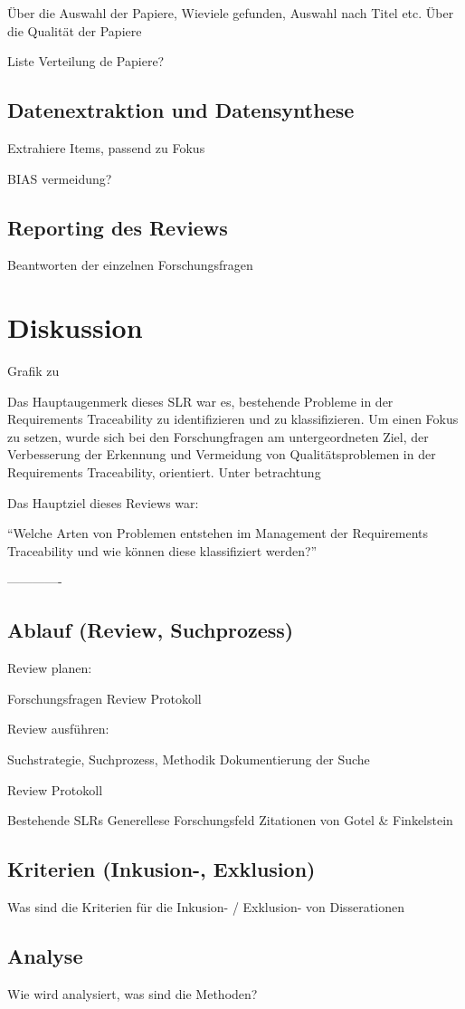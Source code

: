 Über die Auswahl der Papiere, Wieviele gefunden, Auswahl nach Titel etc.
Über die Qualität der Papiere

Liste Verteilung de Papiere?

\subsection{Datenextraktion und Datensynthese}

Extrahiere Items, passend zu Fokus



BIAS vermeidung?

\subsection{Reporting des Reviews}

Beantworten der einzelnen Forschungsfragen

\section{Diskussion}

Grafik zu

Das Hauptaugenmerk dieses SLR war es, bestehende Probleme in der Requirements Traceability zu identifizieren und zu klassifizieren. Um einen Fokus zu setzen, wurde sich bei den Forschungfragen am untergeordneten Ziel, der Verbesserung der Erkennung und Vermeidung von Qualitätsproblemen in der Requirements Traceability, orientiert. Unter betrachtung 

Das Hauptziel dieses Reviews war:

\begin{center}
\enquote{Welche Arten von Problemen entstehen im Management der Requirements Traceability und wie können diese klassifiziert werden?}
\end{center}

-------------



\subsection{Ablauf (Review, Suchprozess)}

Review planen:

Forschungsfragen
Review Protokoll

Review ausführen:

Suchstrategie, Suchprozess, Methodik
Dokumentierung der Suche

Review Protokoll

Bestehende SLRs
Generellese Forschungsfeld
Zitationen von Gotel \& Finkelstein

\subsection{Kriterien (Inkusion-, Exklusion)}

Was sind die Kriterien für die Inkusion- / Exklusion- von Disserationen

\subsection{Analyse}

Wie wird analysiert, was sind die Methoden?
